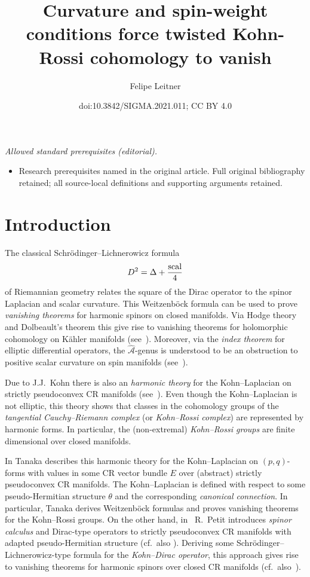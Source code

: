 \documentclass[10pt,a4paper]{amsart}
\title{Curvature and spin-weight conditions force twisted Kohn-Rossi cohomology to vanish}
\author{Felipe Leitner}
\date{doi:10.3842/SIGMA.2021.011; CC BY 4.0}
\numberwithin{equation}{section}
\begin{document}
\maketitle
\noindent\textit{Allowed standard prerequisites (editorial).}\begin{itemize}
\item Research prerequisites named in the original article. Full original bibliography retained; all source-local definitions and supporting arguments retained.
\end{itemize}\medskip
\section{Introduction} \label{Sec1}

The classical Schr\"odinger--Lichnerowicz formula
\[
D^2 = \Delta +\frac{{\rm scal}}{4}
\]
of Riemannian geometry relates the square of the Dirac operator to the spinor Laplacian and scalar curvature.
This Weitzenb\"ock formula can be used to prove {\em vanishing theorems} for harmonic spinors on closed manifolds.
Via Hodge theory and Dolbeault's theorem this give rise to vanishing theorems for holomorphic cohomology
on K\"ahler manifolds (see~\cite{Hitch}). Moreover, via the {\em index theorem} for elliptic differential operators, the $\hat{\mathcal{A}}$-genus is understood to be an obstruction to positive scalar curvature on spin manifolds (see~\cite{Lich}).

Due to J.J.~Kohn there is also an {\em harmonic theory} for the Kohn--Laplacian on strictly pseudoconvex CR manifolds (see~\cite{FK,Koh}). Even though the Kohn--Laplacian is not elliptic, this theory shows that classes in the cohomology groups of the {\em tangential Cauchy--Riemann complex} (or {\em Kohn--Rossi complex}) are represented by harmonic forms. In particular, the (non-extremal) {\em Kohn--Rossi groups} are finite dimensional over closed manifolds.

In \cite{Tan} Tanaka describes this harmonic theory for the Kohn--Laplacian on $(p,q)$-forms with values in some CR vector bundle $E$
over (abstract) strictly pseudoconvex CR manifolds.
The Kohn--Laplacian is defined with respect to some pseudo-Hermitian structure $\theta$ and the corresponding {\em canonical connection}.
In particular, Tanaka derives Weitzenb\"ock formulas and proves vanishing theorems
for the Kohn--Rossi groups. On the other hand, in~\cite{Pet} R.~Petit introduces {\em spinor calculus} and Dirac-type operators to strictly pseudoconvex CR manifolds
with adapted pseudo-Hermitian structure (cf.~also \cite{LeiN1, Stadt}). Deriving some Schr\"odinger--Lichnerowicz-type formula
for the {\em Kohn--Dirac operator}, this approach gives rise to vanishing theorems for harmonic spinors over closed CR manifolds (cf.\ also~\cite{Kor}).
\end{document}
